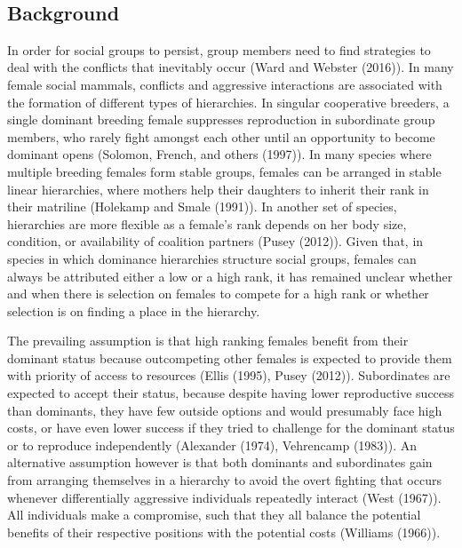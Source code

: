 \documentclass[
]{article}
\begin{document}
~

\hypertarget{background}{%
\subsection{Background}\label{background}}

In order for social groups to persist, group members need to find
strategies to deal with the conflicts that inevitably occur (Ward and
Webster (2016)). In many female social mammals, conflicts and aggressive
interactions are associated with the formation of different types of
hierarchies. In singular cooperative breeders, a single dominant
breeding female suppresses reproduction in subordinate group members,
who rarely fight amongst each other until an opportunity to become
dominant opens (Solomon, French, and others (1997)). In many species
where multiple breeding females form stable groups, females can be
arranged in stable linear hierarchies, where mothers help their
daughters to inherit their rank in their matriline (Holekamp and Smale
(1991)). In another set of species, hierarchies are more flexible as a
female's rank depends on her body size, condition, or availability of
coalition partners (Pusey (2012)). Given that, in species in which
dominance hierarchies structure social groups, females can always be
attributed either a low or a high rank, it has remained unclear whether
and when there is selection on females to compete for a high rank or
whether selection is on finding a place in the hierarchy.

The prevailing assumption is that high ranking females benefit from
their dominant status because outcompeting other females is expected to
provide them with priority of access to resources (Ellis (1995), Pusey
(2012)). Subordinates are expected to accept their status, because
despite having lower reproductive success than dominants, they have few
outside options and would presumably face high costs, or have even lower
success if they tried to challenge for the dominant status or to
reproduce independently (Alexander (1974), Vehrencamp (1983)). An
alternative assumption however is that both dominants and subordinates
gain from arranging themselves in a hierarchy to avoid the overt
fighting that occurs whenever differentially aggressive individuals
repeatedly interact (West (1967)). All individuals make a compromise,
such that they all balance the potential benefits of their respective
positions with the potential costs (Williams (1966)).
\end{document}
